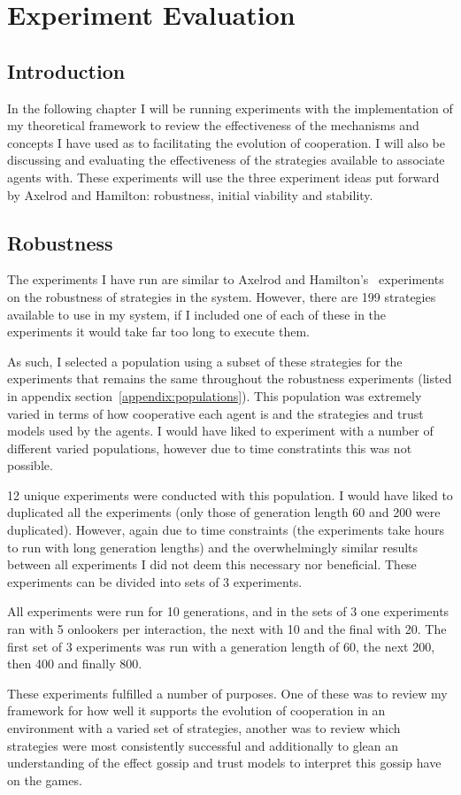 \documentclass[]{final_report}
\begin{document}
\chapter{Experiment Evaluation}
\section{Introduction}
In the following chapter I will be running experiments with the implementation of my theoretical framework to review the effectiveness of the mechanisms and concepts I have used as to facilitating the evolution of cooperation. I will also be discussing and evaluating the effectiveness of the strategies available to associate agents with. These experiments will use the three experiment ideas put forward by Axelrod and Hamilton: robustness, initial viability and stability.

\section{Robustness}
The experiments I have run are similar to Axelrod and Hamilton's~\cite{evolution_of_cooperation} experiments on the robustness of strategies in the system. However, there are 199 strategies available to use in my system, if I included one of each of these in the experiments it would take far too long to execute them.\par 
As such, I selected a population using a subset of these strategies for the experiments that remains the same throughout the robustness experiments (listed in appendix section~\ref{appendix:populations}). This population was extremely varied in terms of how cooperative each agent is and the strategies and trust models used by the agents. I would have liked to experiment with a number of different varied populations, however due to time constratints this was not possible.\par 
12 unique experiments were conducted with this population. I would have liked to duplicated all the experiments (only those of generation length 60 and 200 were duplicated). However, again due to time constraints (the experiments take hours to run with long generation lengths) and the overwhelmingly similar results between all experiments I did not deem this necessary nor beneficial. These experiments can be divided into sets of 3 experiments.\par 
All experiments were run for 10 generations, and in the sets of 3 one experiments ran with 5 onlookers per interaction, the next with 10 and the final with 20. The first set of 3 experiments was run with a generation length of 60, the next 200, then 400 and finally 800.\par
These experiments fulfilled a number of purposes. One of these was to review my framework for how well it supports the evolution of cooperation in an environment with a varied set of strategies, another was to review which strategies were most consistently successful and additionally to glean an understanding of the effect gossip and trust models to interpret this gossip have on the games.
\end{document}
